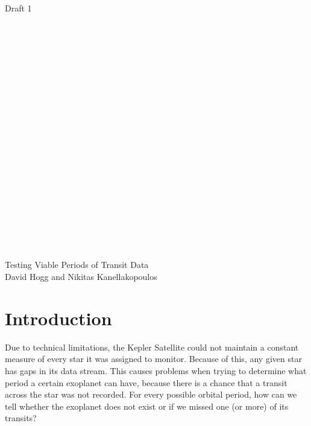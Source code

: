 \documentclass[12pt]{article}
\begin{document}
Draft 1 \\ \\ \\ \\ \\ \\ \\ \\ \\ \\ \\ \\ \\ \\ \\ \\ \\ \\ \\ \\ \\
    \begin{center}
      {\Huge Testing Viable Periods of Transit Data}\\[0.5cm]
      {\Large David Hogg and Nikitas Kanellakopoulos}\\[0.4cm]
    \end{center}

\section{Introduction}

\indent Due to technical limitations, the Kepler Satellite could not maintain a constant measure of every star it was assigned to monitor. Because of this, any given star has gaps in its
data stream. This causes problems when trying to determine what period a certain exoplanet can have, because there is a chance that a transit across the star was not recorded. For every possible orbital period, how can we tell whether the exoplanet does not exist or if we missed one (or more) of its transits? \\ \\ \\ \\ \\ \\ \\ \\ \\ \\ \\ \\ \\ 
\end{document}
